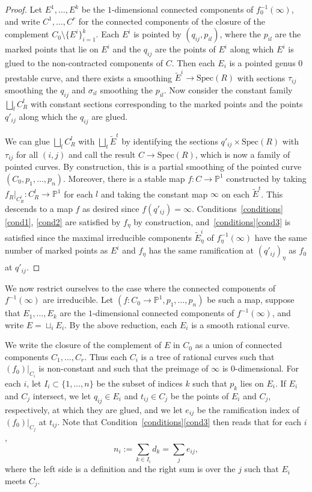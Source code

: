 \documentclass[11pt]{amsart}
\numberwithin{equation}{section}
\theoremstyle{definition}
\theoremstyle{remark}
\newcommand{\bP}{{\mathbb P}}
\newcommand{\Spec}{\mathrm{Spec}}
\begin{document}
\begin{proof} Let $E^1, \ldots, E^k$ be the $1$-dimensional connected components of $f_0^{-1}(\infty)$, and write $C^1, \ldots, C^r$ for the connected components of the closure of the complement $C_0 \setminus \{E^i\}_{i=1}^k$. Each $E^i$ is pointed by $(q_{ij}, p_{il})$, where the $p_{il}$ are the marked points that lie on $E^i$ and the $q_{ij}$ are the points of $E^i$ along which $E^i$ is glued to the non-contracted components of $C$. Then each $E_i$ is a pointed genus $0$ prestable curve, and there exists a smoothing $\widetilde{E}^i \to \Spec(R)$ with sections $\tau_{ij}$ smoothing the $q_{ij}$ and $\sigma_{il}$ smoothing the $p_{il}$. Now consider the constant family $\bigsqcup_l C^l_R$ with constant sections corresponding to the marked points and the points $q'_{ij}$ along which the $q_{ij}$ are glued. 

We can glue $\bigsqcup_l C^l_R$ with $\bigsqcup_t \widetilde{E}^t$ by identifying the sections $q'_{ij} \times \Spec(R)$ with $\tau_{ij}$ for all $(i,j)$ and call the result $C \to \Spec(R)$, which is now a family of pointed curves. By construction, this is a partial smoothing of the pointed curve $(C_0, p_1, \ldots, p_n)$. Moreover, there is a stable map $f\colon  C \to \bP^1$ constructed by taking $f_R|_{C^l_R} \colon C^l_R \to \bP^1$ for each $l$ and taking the constant map $\infty$ on each $\widetilde{E}^t$. This descends to a map $f$ as desired since $f(q'_{ij}) = \infty$. Conditions~\ref{conditions}\eqref{cond1}, \eqref{cond2} are satisfied by $f_\eta$ by construction, and~\ref{conditions}\eqref{cond3} is satisfied since the maximal irreducible components $\tilde{E}^i_\eta$ of $f_\eta^{-1}(\infty)$ have the same number of marked points as $E^i$ and $f_\eta$ has the same ramification at $(q'_{ij})_\eta$ as $f_0$ at $q'_{ij}$. 
\end{proof}

We now restrict ourselves to the case where the connected components of $f^{-1}(\infty)$ are irreducible. Let $(f \colon C_0 \to \bP^1, p_1, \ldots, p_n)$ be such a map, suppose that $E_1, \ldots, E_k$ are the $1$-dimensional connected components of $f^{-1}(\infty)$, and write $E = \sqcup_i E_i$. By the above reduction, each $E_i$ is a smooth rational curve.

We write the closure of the complement of $E$ in $C_0$ as a union of connected components $C_1, \ldots, C_r$. Thus each $C_i$ is a tree of rational curves such that $(f_0)|_{C_i}$ is non-constant and such that the preimage of $\infty$ is $0$-dimensional. For each $i$, let $I_i \subset \{1, \ldots, n\}$ be the subset of indices $k$ such that $p_k$ lies on $E_i$. If $E_i$ and $C_j$ intersect, we let $q_{ij} \in E_i$ and $t_{ij} \in C_j$ be the points of $E_i$ and $C_j$, respectively, at which they are glued, and we let $e_{ij}$ be the ramification index of $(f_0)|_{C_j}$ at $t_{ij}$. Note that Condition~\ref{conditions}\eqref{cond3} then reads that for each $i$, 
$$
n_i := \sum_{k \in I_i} d_k= \sum_{j} e_{ij}, 
$$
where the left side is a definition and the right sum is over the $j$ such that $E_i$ meets $C_j$. 
\end{document}
